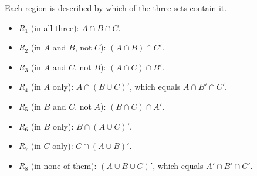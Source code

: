 Each region is described by which of the three sets contain it.
\begin{itemize}
\item $R_1$ (in all three): $A\cap B\cap C$.
\item $R_2$ (in $A$ and $B$, not $C$): $(A\cap B)\cap C'$.
\item $R_3$ (in $A$ and $C$, not $B$): $(A\cap C)\cap B'$.
\item $R_4$ (in $A$ only): $A\cap(B\cup C)'$, which equals $A\cap B'\cap C'$.
\item $R_5$ (in $B$ and $C$, not $A$): $(B\cap C)\cap A'$.
\item $R_6$ (in $B$ only): $B\cap(A\cup C)'$.
\item $R_7$ (in $C$ only): $C\cap(A\cup B)'$.
\item $R_8$ (in none of them): $(A\cup B\cup C)'$, which equals $A'\cap B'\cap C'$.
\end{itemize}
